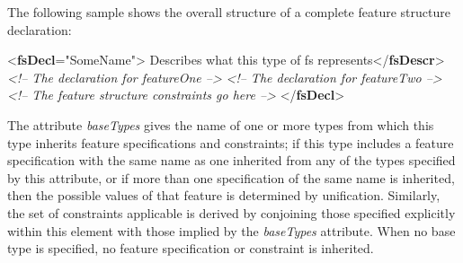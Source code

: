 The following sample shows the overall structure of a complete feature structure declaration: \par\bgroup{}\exampleFont \begin{shaded}\noindent\mbox{}{<\textbf{fsDecl}\hspace*{1em}{type}="{SomeName}">}\mbox{}\newline 
{}Describes what this type of fs represents{</\textbf{fsDescr}>}\mbox{}\newline 
{}\mbox{}\newline 
\textit{<!-- The declaration for featureOne -->}\mbox{}\newline 
{}\mbox{}\newline 
{}\mbox{}\newline 
\textit{<!-- The declaration for featureTwo -->}\mbox{}\newline 
{}\mbox{}\newline 
{}\mbox{}\newline 
\textit{<!-- The feature structure constraints go here -->}\mbox{}\newline 
{}\mbox{}\newline 
{</\textbf{fsDecl}>}\end{shaded}\egroup\par \par
The attribute {\itshape baseTypes} gives the name of one or more types from which this type inherits feature specifications and constraints; if this type includes a feature specification with the same name as one inherited from any of the types specified by this attribute, or if more than one specification of the same name is inherited, then the possible values of that feature is determined by unification. Similarly, the set of constraints applicable is derived by conjoining those specified explicitly within this element with those implied by the {\itshape baseTypes} attribute. When no base type is specified, no feature specification or constraint is inherited.\par
